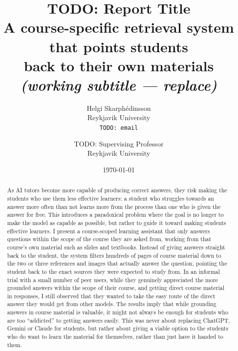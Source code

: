\documentclass[11pt,a4paper]{article}
\title{\textbf{TODO: Report Title}\\
  \large A course-specific retrieval system that points students\\
  back to their own materials\\[0.3em]
  \normalsize \textit{(working subtitle --- replace)}}
\author{
  Helgi Skarph\'edinsson\\
  \small Reykjavik University\\
  \small \texttt{TODO: email}
  \and
  TODO: Supervising Professor\\
  \small Reykjavik University
}
\date{\today}
\begin{document}
\maketitle

\begin{abstract}
\noindent
As AI tutors become more capable of producing correct answers, they risk making the students who use them less effective learners: a student who struggles towards an answer more often than not learns more from the process than one who is given the answer for free. This introduces a paradoxical problem where the goal is no longer to make the model as capable as possible, but rather to guide it toward making students effective learners. I present a course-scoped learning assistant that only answers questions within the scope of the course they are asked from, working from that course's own material such as slides and textbooks. Instead of giving answers straight back to the student, the system filters hundreds of pages of course material down to the two or three references and images that actually answer the question, pointing the student back to the exact sources they were expected to study from. In an informal trial with a small number of peer users, while they genuinely appreciated the more grounded answers within the scope of their course, and getting direct course material in responses, I still observed that they wanted to take the easy route of the direct answer they would get from other models. The results imply that while grounding answers in course material is valuable, it might not always be enough for students who are too ``addicted'' to getting answers easily. This was never about replacing ChatGPT, Gemini or Claude for students, but rather about giving a viable option to the students who do want to learn the material for themselves, rather than just have it handed to them.
\end{abstract}











\end{document}
